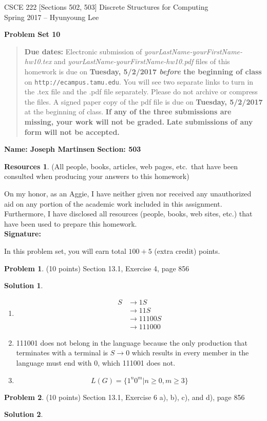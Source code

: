 \documentclass{article}
\theoremstyle{definition}
\newtheorem{problem}{Problem}
\newtheorem*{solution}{Solution}
\newtheorem*{resources}{Resources}
\newcommand{\name}[2]{\noindent\textbf{Name: #1}\hfill \textbf{Section: #2}}
\newcommand{\honor}{\noindent On my honor, as an Aggie, I have neither
  given nor received any unauthorized aid on any portion of the
  academic work included in this assignment. Furthermore, I have
  disclosed all resources (people, books, web sites, etc.) that have
  been used to prepare this homework. \\[2ex]
 \textbf{Signature:} \underline{\hspace*{10cm}} }
\newcommand{\problemset}[1]{\begin{center}\textbf{Problem Set #1}\end{center}}
\newcommand{\duedate}[2]{\begin{quote}\textbf{Due dates:} Electronic
    submission of \textsl{yourLastName-yourFirstName-hw10.tex} and 
    \textsl{yourLastName-yourFirstName-hw10.pdf} files of this homework is due on
    \textbf{#1} on \texttt{http://ecampus.tamu.edu}. You will see two separate links
    to turn in the .tex file and the .pdf file separately. Please do not archive or compress the files.  
    A signed paper copy of the pdf file is due on \textbf{#2} at the beginning of class.
    \textbf{If any of the three submissions are missing, your work will not be graded.}
    \textbf{Late submissions of any form will not be accepted.}\end{quote} }
\begin{document}
\vspace*{-18mm}
\begin{center}
{\large
CSCE 222 [Sections 502, 503] Discrete Structures for Computing\\[.5ex]
Spring 2017 -- Hyunyoung Lee\\}
\end{center}
\problemset{10}
\duedate{Tuesday, 5/2/2017 \textit{before} the beginning of class}{Tuesday, 5/2/2017}
\name{ Joseph Martinsen }{503}
\begin{resources} (All people, books, articles, web pages, etc.\ that
  have been consulted when producing your answers to this homework)
\end{resources}
\honor

\bigskip

\noindent
In this problem set, you will earn total $100+5$ (extra credit) points.

\begin{problem} (10 points)
Section 13.1, Exercise 4, page 856
\end{problem}
\begin{solution} \ \\
  \begin{enumerate}
    \item 
      \begin{align*}
        S &\rightarrow 1S \\
        &\rightarrow 11S \\
        &\rightarrow 11100S \\
        &\rightarrow 111000
      \end{align*}
      
      \item
      111001 does not belong in the language because the only production that
      terminates with a terminal is $S \rightarrow 0$ which results in every member
      in the language must end with 0, which 111001 does not.
      
      \item
      $$L(G) = \{ 1^n 0^m \vert n\ge 0, m \ge 3 \} $$
  \end{enumerate}
\end{solution}

\begin{problem} (10 points)
Section 13.1, Exercise 6 a), b), c), and d), page 856
\end{problem}
\begin{solution} 
\end{solution}
\end{document}
